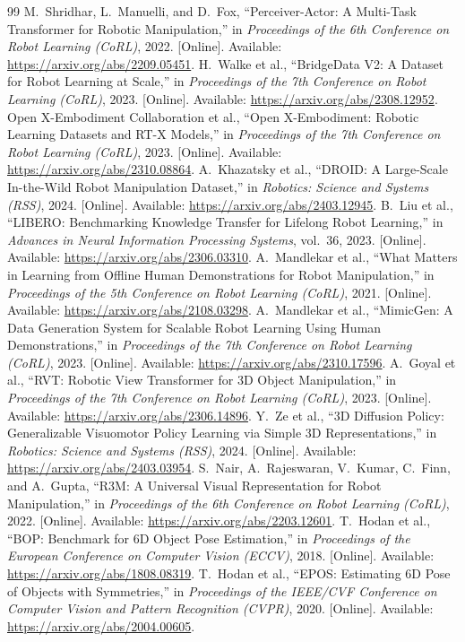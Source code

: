 \documentclass[12pt, letterpaper]{article}
\begin{document}
\begin{thebibliography}{99}
 M.~Shridhar, L.~Manuelli, and D.~Fox, ``Perceiver-Actor: A Multi-Task Transformer for Robotic Manipulation,'' in \textit{Proceedings of the 6th Conference on Robot Learning (CoRL)}, 2022. [Online]. Available: \url{https://arxiv.org/abs/2209.05451}.
 H.~Walke et al., ``BridgeData V2: A Dataset for Robot Learning at Scale,'' in \textit{Proceedings of the 7th Conference on Robot Learning (CoRL)}, 2023. [Online]. Available: \url{https://arxiv.org/abs/2308.12952}.
 Open X-Embodiment Collaboration et al., ``Open X-Embodiment: Robotic Learning Datasets and RT-X Models,'' in \textit{Proceedings of the 7th Conference on Robot Learning (CoRL)}, 2023. [Online]. Available: \url{https://arxiv.org/abs/2310.08864}.
 A.~Khazatsky et al., ``DROID: A Large-Scale In-the-Wild Robot Manipulation Dataset,'' in \textit{Robotics: Science and Systems (RSS)}, 2024. [Online]. Available: \url{https://arxiv.org/abs/2403.12945}.
 B.~Liu et al., ``LIBERO: Benchmarking Knowledge Transfer for Lifelong Robot Learning,'' in \textit{Advances in Neural Information Processing Systems}, vol.~36, 2023. [Online]. Available: \url{https://arxiv.org/abs/2306.03310}.
 A.~Mandlekar et al., ``What Matters in Learning from Offline Human Demonstrations for Robot Manipulation,'' in \textit{Proceedings of the 5th Conference on Robot Learning (CoRL)}, 2021. [Online]. Available: \url{https://arxiv.org/abs/2108.03298}.
 A.~Mandlekar et al., ``MimicGen: A Data Generation System for Scalable Robot Learning Using Human Demonstrations,'' in \textit{Proceedings of the 7th Conference on Robot Learning (CoRL)}, 2023. [Online]. Available: \url{https://arxiv.org/abs/2310.17596}.
 A.~Goyal et al., ``RVT: Robotic View Transformer for 3D Object Manipulation,'' in \textit{Proceedings of the 7th Conference on Robot Learning (CoRL)}, 2023. [Online]. Available: \url{https://arxiv.org/abs/2306.14896}.
 Y.~Ze et al., ``3D Diffusion Policy: Generalizable Visuomotor Policy Learning via Simple 3D Representations,'' in \textit{Robotics: Science and Systems (RSS)}, 2024. [Online]. Available: \url{https://arxiv.org/abs/2403.03954}.
 S.~Nair, A.~Rajeswaran, V.~Kumar, C.~Finn, and A.~Gupta, ``R3M: A Universal Visual Representation for Robot Manipulation,'' in \textit{Proceedings of the 6th Conference on Robot Learning (CoRL)}, 2022. [Online]. Available: \url{https://arxiv.org/abs/2203.12601}.
 T.~Hodan et al., ``BOP: Benchmark for 6D Object Pose Estimation,'' in \textit{Proceedings of the European Conference on Computer Vision (ECCV)}, 2018. [Online]. Available: \url{https://arxiv.org/abs/1808.08319}.
 T.~Hodan et al., ``EPOS: Estimating 6D Pose of Objects with Symmetries,'' in \textit{Proceedings of the IEEE/CVF Conference on Computer Vision and Pattern Recognition (CVPR)}, 2020. [Online]. Available: \url{https://arxiv.org/abs/2004.00605}.
\end{thebibliography}
\end{document}
